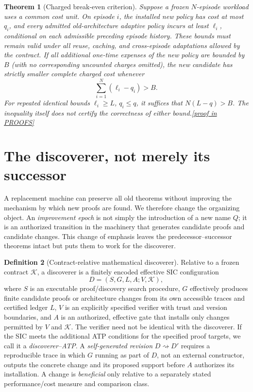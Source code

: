 \documentclass[11pt,letterpaper]{article}
\newtheorem{theorem}{Theorem}[section]
\theoremstyle{definition}
\newtheorem{definition}[theorem]{Definition}
\theoremstyle{remark}
\newcommand{\K}{\mathcal K}
\newcommand{\prooflink}[1]{\hfill\hyperlink{proof:#1}{\footnotesize[proof in PROOFS]}}
\begin{document}
\begin{theorem}[Charged break-even criterion]\label{thm:break}\hypertarget{claim:break}{}
Suppose a frozen $N$-episode workload uses a common cost unit. On episode $i$, the installed new policy has cost at most $q_i$, and every admitted old-architecture adaptive policy incurs at least $\ell_i$, \emph{conditional on each admissible preceding episode history}. These bounds must remain valid under all reuse, caching, and cross-episode adaptations allowed by the contract. If all additional one-time expenses of the new policy are bounded by $B$ (with no corresponding uncounted charges omitted), the new candidate has strictly smaller complete charged cost whenever
\[
       \sum_{i=1}^N(\ell_i-q_i)>B.
\]
For repeated identical bounds $\ell_i\geq L$, $q_i\leq q$, it suffices that $N(L-q)>B$. The inequality itself does not certify the correctness of either bound.\prooflink{break}
\end{theorem}

\section{The discoverer, not merely its successor}\label{sec:discoverer}
A replacement machine can preserve all old theorems without improving the mechanism by which new proofs are found. We therefore change the organizing object. An \emph{improvement epoch} is not simply the introduction of a new name $Q$; it is an authorized transition in the machinery that generates candidate proofs and candidate changes. This change of emphasis leaves the predecessor--successor theorems intact but puts them to work for the discoverer.

\begin{definition}[Contract-relative mathematical discoverer]\label{def:disc}
Relative to a frozen contract $\K$, a discoverer is a finitely encoded effective SIC configuration
\[
 D=(S,G,L,A;V,\K),
\]
where $S$ is an executable proof/discovery search procedure, $G$ effectively produces finite candidate proofs or architecture changes from its own accessible traces and certified ledger $L$, $V$ is an explicitly specified verifier with trust and version boundaries, and $A$ is an authorized, effective gate that installs only changes permitted by $V$ and $\K$. The verifier need not be identical with the discoverer. If the SIC meets the additional ATP conditions for the specified proof targets, we call it a \emph{discoverer--ATP}. A \emph{self-generated revision} $D\rightsquigarrow D'$ requires a reproducible trace in which $G$ running as part of $D$, not an external constructor, outputs the concrete change and its proposed support before $A$ authorizes its installation. A change is \emph{beneficial} only relative to a separately stated performance/cost measure and comparison class.
\end{definition}
\end{document}
